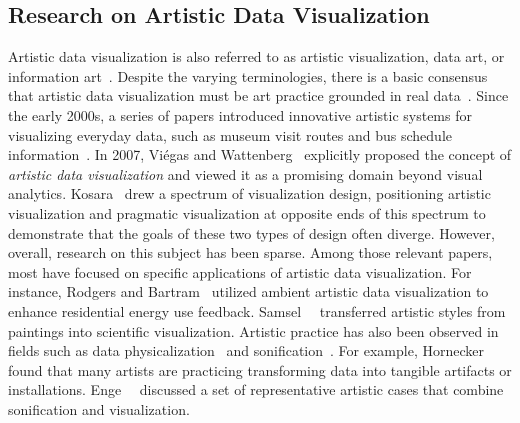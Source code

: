 \subsection{Research on Artistic Data Visualization}
\label{ssec:artisticvis}

Artistic data visualization is also referred to as artistic visualization, data art, or information art~\cite{holmquist2003informative,rodgers2011exploring,few,viegas2007artistic}. Despite the varying terminologies, there is a basic consensus that artistic data visualization must be art practice grounded in real data~\cite{viegas2007artistic}.
Since the early 2000s, a series of papers introduced innovative artistic systems for visualizing everyday data, such as museum visit routes and bus schedule information~\cite{skog2003between,holmquist2003informative,viegas2004artifacts}.
In 2007, Viégas and Wattenberg~\cite{viegas2007artistic} explicitly proposed the concept of \textit{artistic data visualization} and viewed it as a promising domain beyond visual analytics.
Kosara~\cite{kosara2007visualization} drew a spectrum of visualization design, positioning artistic visualization and pragmatic visualization at opposite ends of this spectrum to demonstrate that the goals of these two types of design often diverge. 
However, overall, research on this subject has been sparse. Among those relevant papers, most have focused on specific applications of artistic data visualization. 
For instance, Rodgers and Bartram~\cite{rodgers2011exploring} utilized ambient artistic data visualization to enhance residential energy use feedback. Samsel~\etal~\cite{samsel2018art} transferred artistic styles from paintings into scientific visualization.
Artistic practice has also been observed in fields such as data physicalization~\cite{hornecker2023design,perovich2020chemicals,offenhuber2019data} and sonification~\cite{enge2024open}. For example, Hornecker~\etal~\cite{hornecker2023design} found that many artists are practicing transforming data into tangible artifacts or installations. Enge~\etal~\cite{enge2024open} discussed a set of representative artistic cases that combine sonification and visualization.

